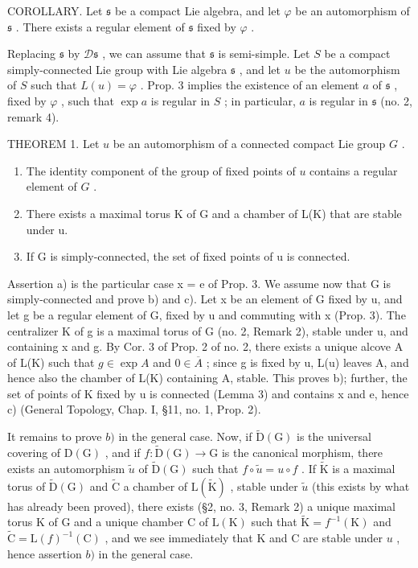 COROLLARY. Let \(\mathfrak{s}\) be a compact Lie algebra, and let \(\varphi\) be an automorphism of \(\mathfrak{s}\) . There exists a regular element of \(\mathfrak{s}\) fixed by \(\varphi\) .

Replacing \(\mathfrak{s}\) by \(\mathcal{D}\mathfrak{s}\) , we can assume that \(\mathfrak{s}\) is semi-simple. Let \(S\) be a compact simply-connected Lie group with Lie algebra \(\mathfrak{s}\) , and let \(u\) be the automorphism of \(S\) such that \(L(u) = \varphi\) . Prop. 3 implies the existence of an element \(a\) of \(\mathfrak{s}\) , fixed by \(\varphi\) , such that \(\exp a\) is regular in \(S\) ; in particular, \(a\) is regular in \(\mathfrak{s}\) (no. 2, remark 4).

THEOREM 1. Let \(u\) be an automorphism of a connected compact Lie group \(G\) .

\begin{enumerate}
\def\labelenumi{\alph{enumi})}
\item
  The identity component of the group of fixed points of \(u\) contains a regular element of \(G\) .
\item
  There exists a maximal torus K of G and a chamber of L(K) that are stable under u.
\item
  If G is simply-connected, the set of fixed points of u is connected.
\end{enumerate}

Assertion a) is the particular case x = e of Prop. 3. We assume now that G is simply-connected and prove b) and c). Let x be an element of G fixed by u, and let g be a regular element of G, fixed by u and commuting with x (Prop. 3). The centralizer K of g is a maximal torus of G (no. 2, Remark 2), stable under u, and containing x and g. By Cor. 3 of Prop. 2 of no. 2, there exists a unique alcove A of L(K) such that \(g \in \exp A\) and \(0 \in \overline{A}\) ; since g is fixed by u, L(u) leaves A, and hence also the chamber of L(K) containing A, stable. This proves b); further, the set of points of K fixed by u is connected (Lemma 3) and contains x and e, hence c) (General Topology, Chap. I, §11, no. 1, Prop. 2).

It remains to prove \(b)\) in the general case. Now, if \(\tilde{\mathrm{D}}(\mathrm{G})\) is the universal covering of \(\mathrm{D}(\mathrm{G})\) , and if \(f: \tilde{\mathrm{D}}(\mathrm{G}) \to \mathrm{G}\) is the canonical morphism, there exists an automorphism \(\tilde{u}\) of \(\tilde{\mathrm{D}}(\mathrm{G})\) such that \(f \circ \tilde{u} = u \circ f\) . If \(\tilde{\mathrm{K}}\) is a maximal torus of \(\tilde{\mathrm{D}}(\mathrm{G})\) and \(\tilde{\mathrm{C}}\) a chamber of \(\mathrm{L}(\tilde{\mathrm{K}})\) , stable under \(\tilde{u}\) (this exists by what has already been proved), there exists (§2, no. 3, Remark 2) a unique maximal torus \(\mathrm{K}\) of \(\mathrm{G}\) and a unique chamber \(\mathrm{C}\) of \(\mathrm{L}(\mathrm{K})\) such that \(\tilde{\mathrm{K}} = f^{-1}(\mathrm{K})\) and \(\tilde{\mathrm{C}} = \mathrm{L}(f)^{-1}(\mathrm{C})\) , and we see immediately that \(\mathrm{K}\) and \(\mathrm{C}\) are stable under \(u\) , hence assertion \(b)\) in the general case.

